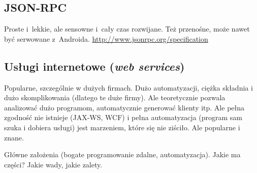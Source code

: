 \subsection{JSON-RPC}
\label{json-rpc}
Proste i~lekkie, ale sensowne i~cały czas rozwijane. Też przenośne, może nawet być serwowane z~Androida.
\url{http://www.jsonrpc.org/specification}

\subsection{Usługi internetowe (\emph{web services})}
Popularne, szczególnie w dużych firmach. Dużo automatyzacji, ciężka składnia i dużo skomplikowania (dlatego te duże firmy).
Ale teoretycznie pozwala analizować dużo programom, automatycznie generować klienty itp. Ale pełna zgodność nie istnieje (JAX-WS, WCF) i pełna automatyzacja (program sam szuka i dobiera usługi) jest marzeniem, które się nie ziściło. Ale popularne i znane.

Główne założenia (bogate programowanie zdalne, automatyzacja). Jakie ma części? Jakie wady, jakie zalety.


